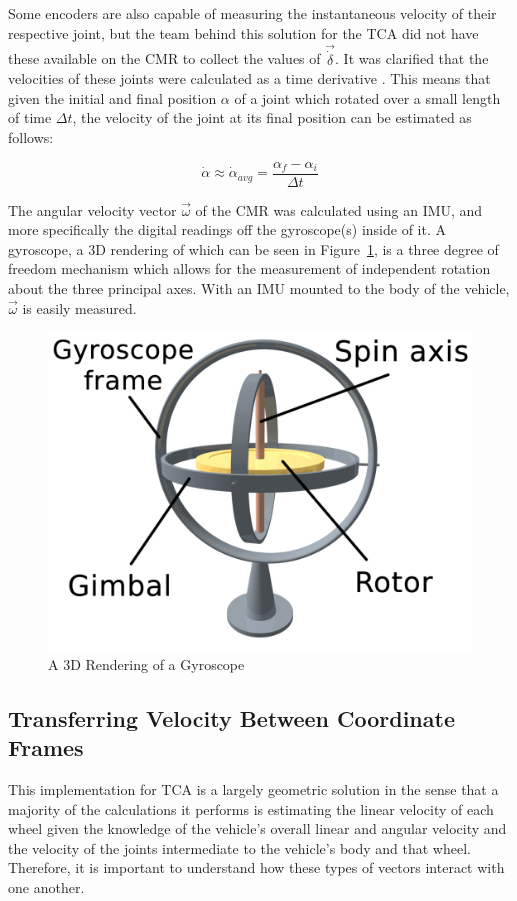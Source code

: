 Some encoders are also capable of measuring the instantaneous velocity of their respective joint, but the team behind this solution for the \ac{TCA} did not have these available on the \ac{CMR} to collect the values of $\vec{\dot{\delta}}$. It was clarified that the velocities of these joints were calculated as a time derivative \cite{tractl}. This means that given the initial and final position $\alpha$ of a joint which rotated over a small length of time $\Delta t$, the velocity of the joint at its final position can be estimated as follows:

\begin{equation}
	\dot{\alpha} \approx \dot{\alpha}_{avg} = \frac{\alpha_{f} - \alpha_{i}}{\Delta t}
\end{equation}

The angular velocity vector $\vec{\omega}$ of the \ac{CMR} was calculated using an \ac{IMU}, and more specifically the digital readings off the gyroscope(s) inside of it. A gyroscope, a 3D rendering of which can be seen in Figure~\ref{traction_control:algorithms:gyro}, is a three degree of freedom mechanism which allows for the measurement of independent rotation about the three principal axes. With an \ac{IMU} mounted to the body of the vehicle, $\vec{\omega}$ is easily measured.

\begin{figure}[htbp]
	\centering
	\includegraphics[width=.5\textwidth]{sections/algorithms/images/gyroscope.png}
	\caption{A 3D Rendering of a Gyroscope}
	\label{traction_control:algorithms:gyro}
\end{figure}

\subsection{Transferring Velocity Between Coordinate Frames}\label{traction_control:algorithms:transferring-velocity}
This implementation for \ac{TCA} is a largely geometric solution in the sense that a majority of the calculations it performs is estimating the linear velocity of each wheel given the knowledge of the vehicle's overall linear and angular velocity and the velocity of the joints intermediate to the vehicle's body and that wheel. Therefore, it is important to understand how these types of vectors interact with one another. \\

